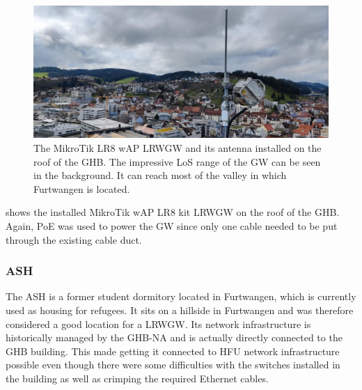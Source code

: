 \begin{figure}[htbp]
    \centering
    \includegraphics[width=1\textwidth]{pictures/hardware/gateway-deployment/lr8_ghb_installation.jpg}
    \caption{
        The MikroTik LR8 wAP \acl{LRWGW} and its antenna installed on the roof of the \ac{GHB}.
        The impressive \ac{LoS} range of the \acl{GW} can be seen in the background.
        It can reach most of the valley in which Furtwangen is located.
    }\label{pic:mikrotik-gateway-ghb-installation}
\end{figure}

 shows the installed MikroTik wAP LR8 kit \acl{LRWGW} on the roof of the \ac{GHB}.
Again, \ac{PoE} was used to power the \acl{GW} since only one cable needed to be put through the existing cable duct.

\subsubsection{\acl{ASH}}

The \ac{ASH} is a former student dormitory located in Furtwangen, which is currently used as housing for refugees.
It sits on a hillside in Furtwangen and was therefore considered a good location for a \acl{LRWGW}.
Its network infrastructure is historically managed by the \acl{GHB-NA} and is actually directly connected to the \ac{GHB} building.
This made getting it connected to \ac{HFU} network infrastructure possible even though there were some difficulties with the switches installed in the building as well as crimping the required Ethernet cables.


